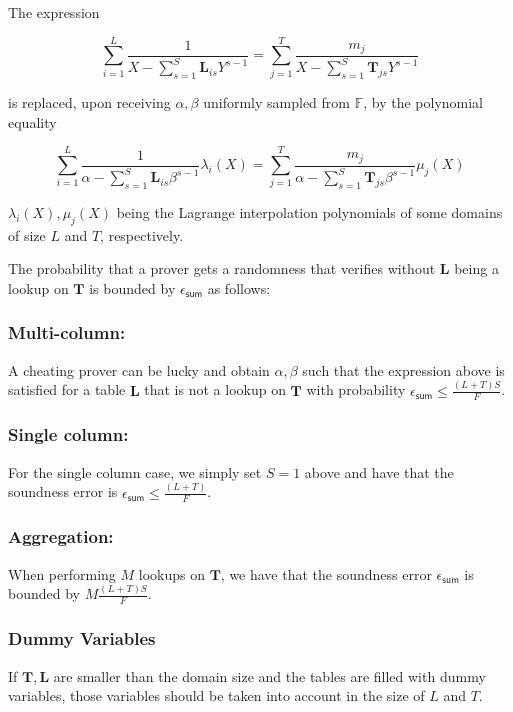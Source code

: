 The expression 

$$\sum_{i=1}^L \frac{1}{X- \sum_{s=1}^S \mathbf L_{is}Y^{s-1}}=\sum_{j=1}^T \frac{m_j}{X-\sum_{s=1}^S \mathbf T_{js}Y^{s-1}}$$

is replaced, upon receiving $\alpha, \beta$ uniformly sampled from $\mathbb{F}$, by the polynomial equality  

$$\sum_{i=1}^L \frac{1}{\alpha- \sum_{s=1}^S \mathbf L_{is}\beta^{s-1}}\lambda_i(X)=\sum_{j=1}^T \frac{m_j}{\alpha-\sum_{s=1}^S \mathbf T_{js}\beta^{s-1}}\mu_j(X)$$

$\lambda_i(X), \mu_j(X)$ being the Lagrange interpolation polynomials of some domains of size $L$ and $T$, respectively.


The probability that a prover gets a randomness that verifies without $\mathbf L$ being a lookup on $\mathbf{T}$ is bounded by $\epsilon_{\mathsf{sum}}$ as follows:


\subsubsection{Multi-column:}


A cheating prover can be lucky and obtain $\alpha, \beta$ such that the expression above is satisfied for a table $\mathbf {L}$ that is not a lookup on $\mathbf{T}$ with probability  $\epsilon_{\mathsf{sum}}\leq \frac{(L+T)S}{F}$.



\subsubsection{Single column:}

For the single column case, we simply set $S=1$ above and have that the soundness error is $\epsilon_{\mathsf{sum}}\leq \frac{(L+T)}{F}$.

\subsubsection{Aggregation:}

When performing $M$ lookups on $\mathbf T$, we have that the soundness error $\epsilon_{\mathsf{sum}}$ is bounded by $ M\frac{(L+T)S}{F}$.

\subsubsection{Dummy Variables}

If $\mathbf T, \mathbf L$ are smaller than the domain size and the tables are filled with dummy variables, those variables should be taken into account in the size of $L$ and $T$. 

